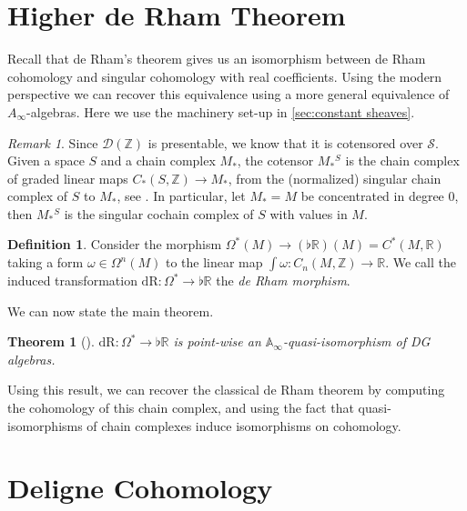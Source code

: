 \documentclass[10pt]{amsart}
\newcommand{\bA}{\mathbb{A}}
\newcommand{\D}{\mathscr{D}}
\newcommand{\s}{\mathscr{S}}
\newcommand{\bR}{\mathbb{R}}
\newcommand{\bZ}{\mathbb{Z}}
\newcommand{\dr}{\mathrm{dR}}
\newtheorem{theorem}[equation]{Theorem}
\theoremstyle{definition}
\newtheorem{definition}[equation]{Definition}
\theoremstyle{remark}
\newtheorem{remark}[equation]{Remark}
\numberwithin{equation}{section}
\begin{document}
\section{Higher de Rham Theorem}
Recall that de Rham's theorem gives us an isomorphism between de Rham cohomology and singular cohomology with real coefficients. Using the modern perspective we can recover this equivalence using a more general equivalence of $A_\infty$-algebras. Here we use the machinery set-up in \cref{sec:constant sheaves}.
\begin{remark}\label{rmk:Dcotensor}
  Since $\D(\bZ)$ is presentable, we know that it is cotensored over $\s$. Given a space $S$ and a chain complex $M_*$, the cotensor $M_*{}^S$ is the chain complex of graded linear maps $C_*(S,\bZ)\to M_*$, from the (normalized) singular chain complex of $S$ to $M_*$, see \cite[Definition 1.3.2.1]{lurie2017ha}. In particular, let $M_*=M$ be concentrated in degree 0, then $M_*{}^S$ is the singular cochain complex of $S$ with values in $M$. 
\end{remark}
\begin{definition}\label{def:derhammorf}
Consider the morphism $\Omega^*(M)\to (\flat\bR)(M)=C^*(M,\bR)$ taking a form $\omega\in\Omega^n(M)$ to the linear map $\int\omega:C_{n}(M,\bZ)\to\bR$. We call the induced transformation $\dr:\Omega^*\to\flat\bR$ the \emph{de Rham morphism}.  
\end{definition}

We can now state the main theorem. 

\begin{theorem}[{\cite[Theorem 3.25]{abad2010ainftyrhamtheoremintegration}}]\label{thm:derham} 
  $\dr:\Omega^*\to\flat\bR$ is point-wise an $\bA_\infty$-quasi-isomorphism of DG algebras.
\end{theorem}

Using this result, we can recover the classical de Rham theorem by computing the cohomology of this chain complex, and using the fact that quasi-isomorphisms of chain complexes induce isomorphisms on cohomology.


\section{Deligne Cohomology}
\end{document}
